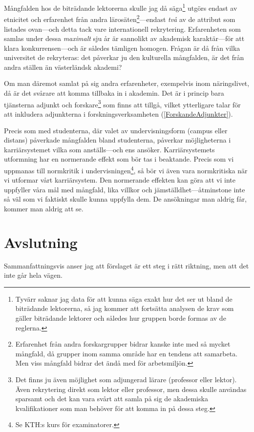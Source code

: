 \documentclass[a4paper,oneside,article,swedish]{memoir}
\let\section\chapter
\begin{document}
Mångfalden hos de biträdande lektorerna skulle jag då säga\footnote{%
  Tyvärr saknar jag data för att kunna säga exakt hur det ser ut bland de 
  biträdande lektorerna, så jag kommer att fortsätta analysen de krav som 
  gäller biträdande lektorer och således hur gruppen borde formas av de 
  reglerna.
} utgörs endast av etnicitet och erfarenhet från andra lärosäten\footnote{%
  Erfarenhet från andra forskargrupper bidrar kanske inte med så mycket 
  mångfald, då grupper inom samma område har en tendens att samarbeta.
  Men viss mångfald bidrar det ändå med för arbetsmiljön.
}---endast \emph{två} av de attribut som listades ovan---och detta tack vare 
internationell rekrytering.
Erfarenheten som samlas under dessa \emph{maximalt} sju år är sannolikt av 
akademisk karaktär---för att klara konkurrensen---och är således tämligen 
homogen.
Frågan är då från vilka universitet de rekryteras:
det påverkar ju den kulturella mångfalden, är det från andra ställen än 
västerländsk akademi?

Om man däremot samlat på sig andra erfarenheter, exempelvis inom näringslivet, 
då är det svårare att komma tillbaka in i akademin.
Det är i princip bara tjänsterna adjunkt och forskare\footnote{%
  Det finns ju även möjlighet som adjungerad lärare (professor eller lektor).
  Även rekrytering direkt som lektor eller professor, men dessa skulle användas 
  sparsamt och det kan vara svårt att samla på sig de akademiska 
  kvalifikationer som man behöver för att komma in på dessa steg.
} som finns att tillgå, vilket ytterligare talar för att inkludera adjunkterna 
i forskningsverksamheten (\cref{ForskandeAdjunkter}).

Precis som med studenterna, där valet av undervisningsform (campus eller 
distans) påverkade mångfalden bland studenterna, påverkar möjligheterna i 
karriärsystemet vilka som anställs---och ens ansöker.
Karriärsystemets utformning har en normerande effekt som bör tas i 
beaktande.
Precis som vi uppmanas till normkritik i undervisningen\footnote{%
  Se KTH:s kurs för examinatorer.
}, så bör vi även vara normkritiska när vi utformar vårt karriärsystem.
Den normerande effekten kan göra att vi inte uppfyller våra mål med 
mångfald, lika villkor och jämställdhet---åtminstone inte så väl som vi 
faktiskt skulle kunna uppfylla dem.
De ansökningar man aldrig får, kommer man aldrig att se.


\section{Avslutning}

Sammanfattningsvis anser jag att förslaget är ett steg i rätt riktning, men att 
det inte går hela vägen.


\printbibliography
\end{document}

